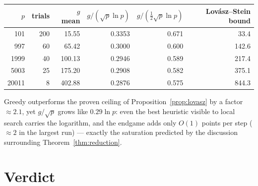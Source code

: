 \documentclass[11pt]{article}
\theoremstyle{definition}
\begin{document}
\begin{center}
\begin{tabular}{rrrrrr}
\toprule
$p$ & trials & $g$ mean & $g/(\sqrt p\ln p)$ &
$g/(\tfrac12\sqrt p\ln p)$ & Lov\'asz--Stein bound\\
\midrule
101 & 200 & 15.55 & 0.3353 & 0.671 & 33.4\\
997 & 60 & 65.42 & 0.3000 & 0.600 & 142.6\\
1999 & 40 & 100.13 & 0.2946 & 0.589 & 217.4\\
5003 & 25 & 175.20 & 0.2908 & 0.582 & 375.1\\
20011 & 8 & 402.88 & 0.2876 & 0.575 & 844.3\\
\bottomrule
\end{tabular}
\end{center}

Greedy outperforms the proven ceiling of Proposition~\ref{prop:lovasz} by a
factor ${\approx}2.1$, yet $g/\sqrt p$ grows like $0.29\ln p$: even the best
heuristic visible to local search carries the logarithm, and the endgame adds
only $O(1)$ points per step ($\approx2$ in the largest run) --- exactly the
saturation predicted by the discussion surrounding
Theorem~\ref{thm:reduction}.

\section{Verdict}\label{sec:verdict}
\end{document}
